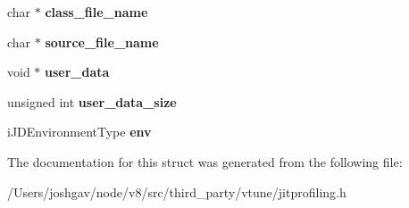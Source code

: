 \begin{DoxyCompactItemize}
\item 
char $\ast$ {\bfseries class\+\_\+file\+\_\+name}\hypertarget{struct__i_j_i_t___method___load_a59e7f7b3c5dccad3d6de566b0a0edd32}{}\label{struct__i_j_i_t___method___load_a59e7f7b3c5dccad3d6de566b0a0edd32}

\item 
char $\ast$ {\bfseries source\+\_\+file\+\_\+name}\hypertarget{struct__i_j_i_t___method___load_a8dc975a3b54110af8007f2418477ac50}{}\label{struct__i_j_i_t___method___load_a8dc975a3b54110af8007f2418477ac50}

\item 
void $\ast$ {\bfseries user\+\_\+data}\hypertarget{struct__i_j_i_t___method___load_a990057599a1696b89c5e8e8bf4ad05f3}{}\label{struct__i_j_i_t___method___load_a990057599a1696b89c5e8e8bf4ad05f3}

\item 
unsigned int {\bfseries user\+\_\+data\+\_\+size}\hypertarget{struct__i_j_i_t___method___load_a8e116b5d71e7b98c6c85e6558d5896c6}{}\label{struct__i_j_i_t___method___load_a8e116b5d71e7b98c6c85e6558d5896c6}

\item 
i\+J\+D\+Environment\+Type {\bfseries env}\hypertarget{struct__i_j_i_t___method___load_a3ce4f9e31a87a8ef08ccc32804aebd6c}{}\label{struct__i_j_i_t___method___load_a3ce4f9e31a87a8ef08ccc32804aebd6c}

\end{DoxyCompactItemize}


The documentation for this struct was generated from the following file\+:\begin{DoxyCompactItemize}
\item 
/\+Users/joshgav/node/v8/src/third\+\_\+party/vtune/jitprofiling.\+h\end{DoxyCompactItemize}
